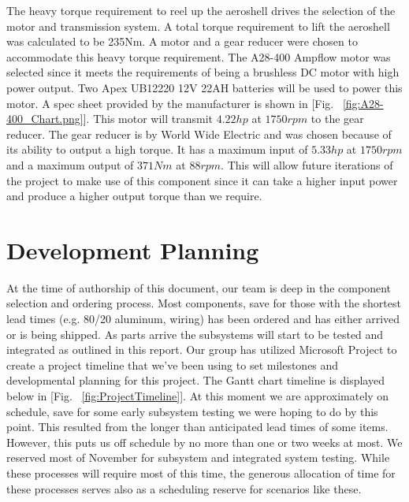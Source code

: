 \indent\indent The heavy torque requirement to reel up the aeroshell drives the selection of the motor and transmission system. A total torque requirement to lift the aeroshell was calculated to be 235Nm. A motor and a gear reducer were chosen to accommodate this heavy torque requirement. The A28-400 Ampflow motor was selected since it meets the requirements of being a brushless DC motor with high power output. Two Apex UB12220 12V 22AH batteries will be used to power this motor. A spec sheet provided by the manufacturer is shown in [Fig. ~\ref{fig:A28-400_Chart.png}]. This motor will transmit $4.22 hp$ at $1750 rpm$ to the gear reducer. The gear reducer is by World Wide Electric and was chosen because of its ability to output a high torque. It has a maximum input of $5.33 hp$ at $1750 rpm$ and a maximum output of $371 Nm$ at $88 rpm$. This will allow future iterations of the project to make use of this component since it can take a higher input power and produce a higher output torque than we require.



 


 




\section{Development Planning}

\indent\indent At the time of authorship of this document, our team is deep in the component selection and ordering process. Most components, save for those with the shortest lead times (e.g. 80/20 aluminum, wiring) has been ordered and has either arrived or is being shipped. As parts arrive the subsystems will start to be tested and integrated as outlined in this report. Our group has utilized Microsoft Project to create a project timeline that we've been using to set milestones and developmental planning for this project. The Gantt chart timeline is displayed below in [Fig. ~\ref{fig:ProjectTimeline}]. At this moment we are approximately on schedule, save for some early subsystem testing we were hoping to do by this point. This resulted from the longer than anticipated lead times of some items. However, this puts us off schedule by no more than one or two weeks at most. We reserved most of November for subsystem and integrated system testing. While these processes will require most of this time, the generous allocation of time for these processes serves also as a scheduling reserve for scenarios like these. 


